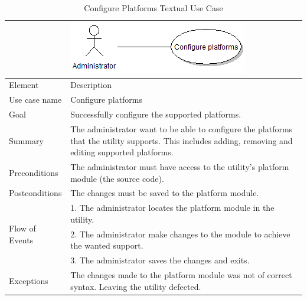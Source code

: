 \begin{table}[htbp] \footnotesize \center
\caption{Configure Platforms Textual Use Case\label{tab:textual:configureplatforms}}
\begin{tabularx}{\textwidth}{l X}
	 & \includegraphics[scale=0.8]{./planning/img/uc_configureplatform} \\
	\toprule
	Element & Description\\
	\midrule
	Use case name & Configure platforms\\
	Goal & Successfully configure the supported platforms.\\
	Summary & The administrator want to be able to configure the platforms that the utility supports. This includes adding, removing and editing supported platforms.\\
	Preconditions & The administrator must have access to the utility's platform module (the source code).\\
	Postconditions & The changes must be saved to the platform module.\\
	\midrule
	\multirow{3}{*}{Flow of Events} & 1. The administrator locates the platform module in the utility. \\
	& 2. The administrator make changes to the module to achieve the wanted support.\\
	& 3. The administrator saves the changes and exits. \\
	\midrule
	Exceptions & The changes made to the platform module was not of correct syntax. Leaving the utility defected. \\
	\bottomrule
\end{tabularx}
\end{table}

